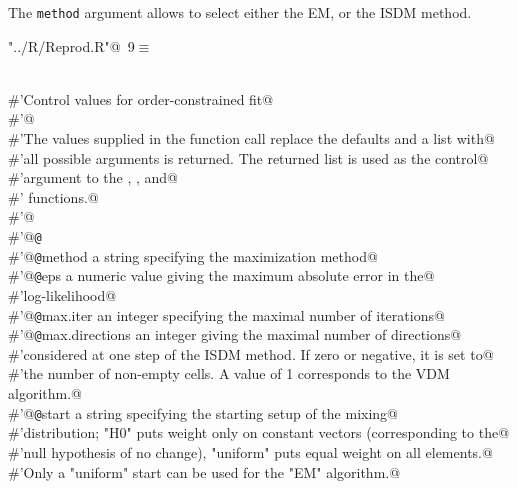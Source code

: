 \documentclass[reqno]{amsart}
\renewcommand{\NWtarget}[2]{\hypertarget{#1}{#2}}
\begin{document}
The \texttt{method} argument allows to select either the EM, or the ISDM method.
\begin{flushleft} \small\label{scrap10}\raggedright\small
\NWtarget{nuweb9}{} \verb@"../R/Reprod.R"@\nobreak\ {\footnotesize {9}}$\equiv$
\vspace{-1ex}
\begin{list}{}{} \item
\mbox{}\verb@@\\
\mbox{}\verb@#'Control values for order-constrained fit@\\
\mbox{}\verb@#'@\\
\mbox{}\verb@#'The values supplied in the function call replace the defaults and a list with@\\
\mbox{}\verb@#'all possible arguments is returned.  The returned list is used as the control@\\
\mbox{}\verb@#'argument to the , , and@\\
\mbox{}\verb@#' functions.@\\
\mbox{}\verb@#'@\\
\mbox{}\verb@#'@{\tt @}\verb@export@\\
\mbox{}\verb@#'@{\tt @}\verb@param method a string specifying the maximization method@\\
\mbox{}\verb@#'@{\tt @}\verb@param eps a numeric value giving the maximum absolute error in the@\\
\mbox{}\verb@#'log-likelihood@\\
\mbox{}\verb@#'@{\tt @}\verb@param max.iter an integer specifying the maximal number of iterations@\\
\mbox{}\verb@#'@{\tt @}\verb@param max.directions an integer giving the maximal number of directions@\\
\mbox{}\verb@#'considered at one step of the ISDM method.  If zero or negative, it is set to@\\
\mbox{}\verb@#'the number of non-empty cells. A value of 1 corresponds to the VDM algorithm.@\\
\mbox{}\verb@#'@{\tt @}\verb@param start a string specifying the starting setup of the mixing@\\
\mbox{}\verb@#'distribution; "H0" puts weight only on constant vectors (corresponding to the@\\
\mbox{}\verb@#'null hypothesis of no change), "uniform" puts equal weight on all elements.@\\
\mbox{}\verb@#'Only a "uniform" start can be used for the "EM" algorithm.@\\

\end{list}
\end{flushleft}
\end{document}
